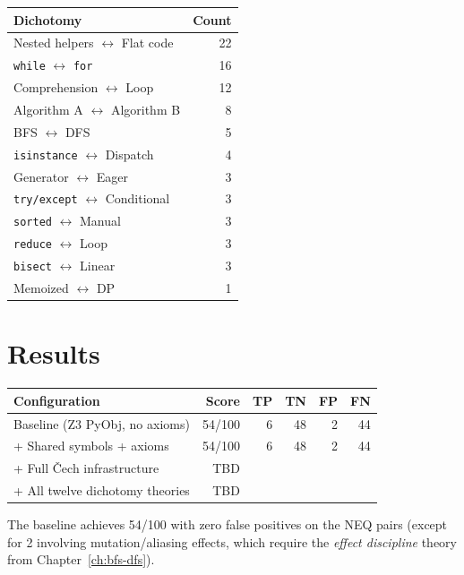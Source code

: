 \documentclass[11pt,a4paper]{report}
\theoremstyle{definition}
\theoremstyle{plain}
\begin{document}
\begin{center}
\begin{tabular}{l r}
  \textbf{Dichotomy} & \textbf{Count} \\
  \hline
  Nested helpers $\leftrightarrow$ Flat code & 22 \\
  \texttt{while} $\leftrightarrow$ \texttt{for} & 16 \\
  Comprehension $\leftrightarrow$ Loop & 12 \\
  Algorithm A $\leftrightarrow$ Algorithm B & 8 \\
  BFS $\leftrightarrow$ DFS & 5 \\
  \texttt{isinstance} $\leftrightarrow$ Dispatch & 4 \\
  Generator $\leftrightarrow$ Eager & 3 \\
  \texttt{try/except} $\leftrightarrow$ Conditional & 3 \\
  \texttt{sorted} $\leftrightarrow$ Manual & 3 \\
  \texttt{reduce} $\leftrightarrow$ Loop & 3 \\
  \texttt{bisect} $\leftrightarrow$ Linear & 3 \\
  Memoized $\leftrightarrow$ DP & 1 \\
\end{tabular}
\end{center}

\section{Results}

\begin{center}
\begin{tabular}{l r r r r r}
  \textbf{Configuration} & \textbf{Score} & \textbf{TP} & \textbf{TN}
  & \textbf{FP} & \textbf{FN} \\
  \hline
  Baseline (Z3 PyObj, no axioms) & 54/100 & 6 & 48 & 2 & 44 \\
  + Shared symbols + axioms & 54/100 & 6 & 48 & 2 & 44 \\
  + Full \v{C}ech infrastructure & TBD & & & & \\
  + All twelve dichotomy theories & TBD & & & & \\
\end{tabular}
\end{center}

The baseline achieves 54/100 with zero false positives on the NEQ pairs
(except for 2 involving mutation/aliasing effects, which require the
\emph{effect discipline} theory from Chapter~\ref{ch:bfs-dfs}).
\end{document}
